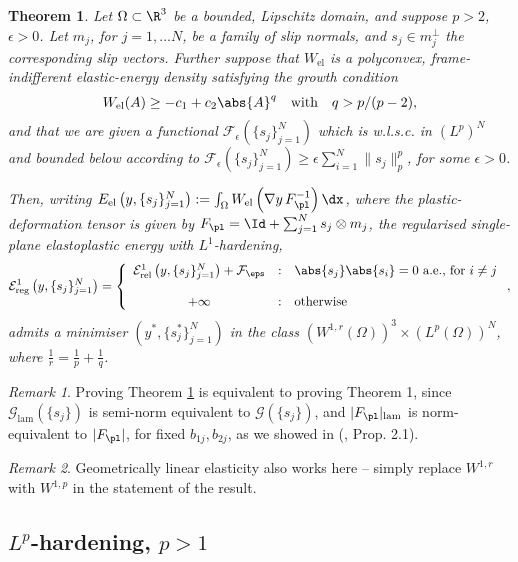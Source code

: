 \documentclass[11pt,reqno]{amsart}
\theoremstyle{plain}
\newtheorem{theorem}{Theorem}
\theoremstyle{definition}
\theoremstyle{remark}
\newtheorem{remark}{Remark}
\begin{document}
\begin{theorem}\label{thm:main_alt}
	Let $\Omega \subset \R^3$ be a bounded, Lipschitz domain, and suppose $p>2$, $\epsilon>0$. Let $m_j$, for $j=1,\ldots N$, be a family of slip normals, and $s_j\in m_j^{\perp}$ the corresponding slip vectors. Further suppose that $W_{\mathrm{el}}$ is a polyconvex, frame-indifferent elastic-energy density satisfying the growth condition 
	\[
	W_{\mathrm{el}}(A) \ge -c_1 + c_2\abs{A}^q\quad \textrm{with}\quad q>p/(p-2),
	\]
and that we are given a functional $\mathcal{F}_{\epsilon}(\{s_j\}_{j=1}^N)$ which is w.l.s.c. in $(L^p)^N$ and bounded below according to 
$\mathcal{F}_{\epsilon}(\{s_j\}_{j=1}^N)\geq\epsilon\sum_{i=1}^N\|s_j\|_p^p$, for some $\epsilon > 0$.
	
Then, writing $E_{\mathrm{el}}\left(y, \{s_j\}_{j=1}^N\right):= \int_{\Omega} W_{\mathrm{el}}\left(\nabla y\,F_\pl^{-1}\right)\dx$, where the plastic-deformation tensor is given by $F_\pl = \Id + \sum_{j=1}^N s_j \otimes m_j$, the regularised single-plane elastoplastic energy with $L^1$-hardening,
	\[
	\mathcal{E}^1_{\mathrm{reg}}\left(y, \{s_j\}_{j=1}^N\right) =  \left\{\begin{array}{ccl}
	\mathcal{E}^1_{\mathrm{rel}}\left(y, \{s_j\}_{j=1}^N\right) + \mathcal{F}_\eps & : & \abs{s_j}\abs{s_i} = 0~\textrm{a.e., for}~i\neq j\\
	& & \\
	+\infty & : & \mathrm{otherwise}
	\end{array} \right.,
	\]
	admits a minimiser $\left(y^{\ast},\{s^{\ast}_j\}_{j=1}^N\right)$ in the class $(W^{1,r}(\Omega))^3\times (L^p(\Omega))^N$, where $\frac{1}{r}=\frac{1}{p}+\frac{1}{q}$.
\end{theorem}


\begin{remark}
Proving Theorem \ref{thm:main_alt} is equivalent to proving Theorem 1, since $\mathcal{G}_{\mathrm{lam}}(\{s_j\})$ is semi-norm equivalent to $\mathcal{G}(\{s_j\})$, and $ |F_{\pl}|_{\textrm{lam}}$ is norm-equivalent to $|F_{\pl}|$, for fixed $b_{1j}, b_{2j}$, as we showed in (\cite{ang2}, Prop. 2.1).
\end{remark}

\begin{remark}
Geometrically linear elasticity also works here -- simply replace $W^{1,r}$ with $W^{1,p}$ in the statement of the result. 
\end{remark}




\subsection{$L^p$-hardening, $p>1$}
\end{document}
